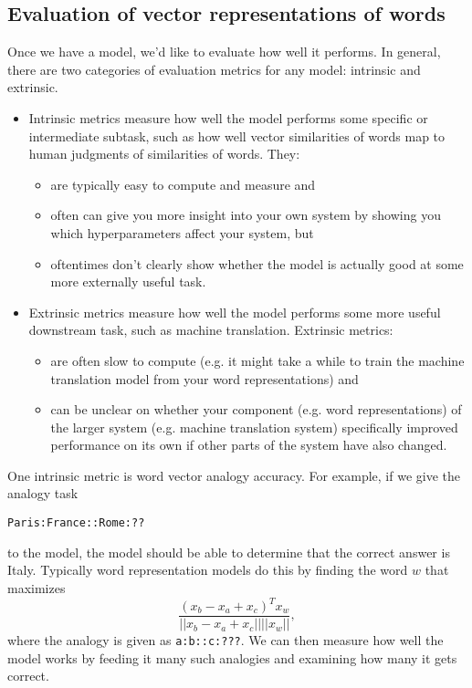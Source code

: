\subsection{Evaluation of vector representations of words}
Once we have a model, we'd like to evaluate how well it performs. In general, there are two categories of evaluation metrics for any model: intrinsic and extrinsic.
\begin{itemize}
\item Intrinsic metrics measure how well the model performs some specific or intermediate subtask, such as how well vector similarities of words map to human judgments of similarities of words. They:
\begin{itemize}
\item are typically easy to compute and measure and
\item often can give you more insight into your own system by showing you which hyperparameters affect your system, but
\item oftentimes don't clearly show whether the model is actually good at some more externally useful task.
\end{itemize}
\item Extrinsic metrics measure how well the model performs some more useful downstream task, such as machine translation. Extrinsic metrics:
\begin{itemize}
\item are often slow to compute (e.g. it might take a while to train the machine translation model from your word representations) and
\item can be unclear on whether your component (e.g. word representations) of the larger system (e.g. machine translation system) specifically improved performance on its own if other parts of the system have also changed.
\end{itemize}
\end{itemize}
One intrinsic metric is word vector analogy accuracy. For example, if we give the analogy task\\
\centerline{\texttt{Paris:France::Rome:??}}
to the model, the model should be able to determine that the correct answer is Italy. Typically word representation models do this by finding the word $w$ that maximizes
$$\frac{(x_b - x_a + x_c)^T x_w}{||x_b - x_a + x_c||||x_w||},$$
where the analogy is given as \texttt{a:b::c:???}. We can then measure how well the model works by feeding it many such analogies and examining how many it gets correct.
